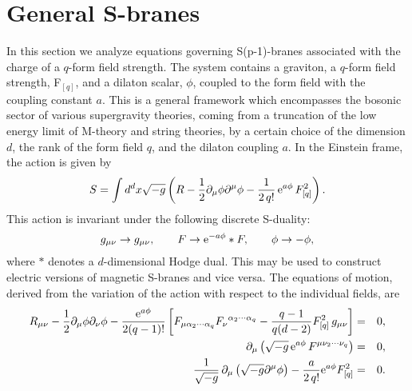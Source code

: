 \documentclass[a4paper,aps,nofootinbib,showpacs,preprint]{revtex4}
\begin{document}
\section{General S-branes}
In this section we analyze equations governing S(p-1)-branes
associated with the charge of a $q$-form field strength. The
system contains a graviton, a $q$-form field strength, F$_{[q]}$,
and a dilaton scalar, $\phi$, coupled to the form field with the
coupling constant $a$. This is a general framework which
encompasses the bosonic sector of various supergravity theories,
coming from a truncation of the low energy limit of M-theory and
string theories, by a certain choice of the dimension $d$, the
rank of the form field $q$, and the dilaton coupling $a$. In the
Einstein frame, the action is given by
\begin{equation}\label{action}
S = \int d^d x \sqrt{-g} \left( R - \frac12 \partial_\mu \phi
\partial^\mu \phi - \frac1{2\, q!} \, {\rm e}^{a\phi} \, F_{[q]}^2
\right).
\end{equation}
This action is invariant under the following discrete S-duality:
\begin{equation} \label{duality}
g_{\mu\nu} \to g_{\mu\nu}, \qquad F \to {\rm e}^{-a\phi} \ast F,
\qquad \phi \to -\phi,
\end{equation}
where $\ast$ denotes a $d$-dimensional Hodge dual. This may be
used to construct electric versions of magnetic S-branes and vice
versa. The equations of motion, derived from the variation of the
action with respect to the individual fields, are
\begin{eqnarray}
R_{\mu\nu} - \frac12 \partial_\mu \phi \partial_\nu \phi -
\frac{{\rm e}^{a\phi}}{2(q-1)!} \left[
F_{\mu\alpha_2\cdots\alpha_q} F_\nu{}^{\alpha_2\cdots\alpha_q}-
\frac{q-1}{q(d-2)} F_{[q]}^2 \, g_{\mu\nu} \right] &=& 0,
\label{Ein} \\
\partial_\mu \left( \sqrt{-g} \, {\rm e}^{a\phi} \,
F^{\mu\nu_2\cdots\nu_q} \right) &=& 0, \label{form} \\
\frac1{\sqrt{-g}}\, \partial_\mu \left( \sqrt{-g} \partial^\mu
\phi \right) - \frac{a}{2\, q!} {\rm e}^{a\phi} F_{[q]}^2 &=& 0.
\label{dil}
\end{eqnarray}
\end{document}
